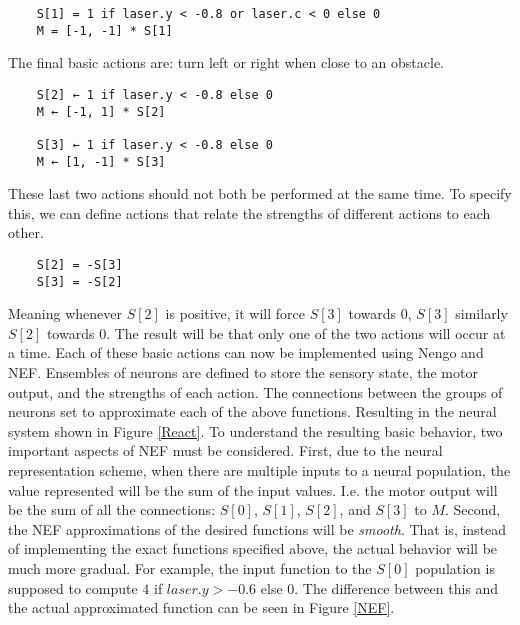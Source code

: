 \documentclass[conference]{IEEEtran}
\begin{document}
\begin{lstlisting}
	S[1] = 1 if laser.y < -0.8 or laser.c < 0 else 0
	M = [-1, -1] * S[1]
\end{lstlisting}
The final basic actions are: turn left or right when close to an obstacle. 
\begin{lstlisting}
	S[2] ← 1 if laser.y < -0.8 else 0
	M ← [-1, 1] * S[2]

	S[3] ← 1 if laser.y < -0.8 else 0
	M ← [1, -1] * S[3]
\end{lstlisting}
These last two actions should not both be performed at the same time. To specify this, we can define actions that relate the strengths of different actions to each other.
\begin{lstlisting}
	S[2] = -S[3]
	S[3] = -S[2]
\end{lstlisting}
Meaning whenever $S[2]$ is positive, it will force $S[3]$ towards $0$, $S[3]$ similarly $S[2]$ towards $0$.
The result will be that only one of the two actions will occur at a time. Each of these basic actions can now be implemented using Nengo and NEF. Ensembles of neurons are defined to store the sensory state, the motor output, and the strengths of each action. The connections between the groups of neurons set to approximate each of the above functions. Resulting in the neural system shown in Figure \ref{React}. To understand the resulting basic behavior, two important aspects of NEF must be considered. First, due to the neural representation scheme, when there are multiple inputs to a neural population, the value represented will be the sum of the input values. I.e. the motor output will be the sum of all the connections: $S[0]$, $S[1]$, $S[2]$, and $S[3]$ to $M$. Second, the NEF approximations of the desired functions will be \textit{smooth}. That is, instead of implementing the exact functions specified above, the actual behavior will be much more gradual. For example, the input function to the $S[0]$ population is supposed to compute $4$ if $laser.y > -0.6$ else $0$. The difference between this and the actual approximated function can be seen in Figure \ref{NEF}.
\end{document}
